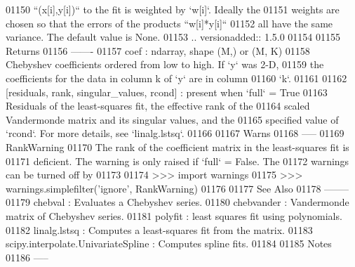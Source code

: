 \begin{DoxyCode}
01150 \textcolor{stringliteral}{        ``(x[i],y[i])`` to the fit is weighted by `w[i]`. Ideally the}
01151 \textcolor{stringliteral}{        weights are chosen so that the errors of the products ``w[i]*y[i]``}
01152 \textcolor{stringliteral}{        all have the same variance.  The default value is None.}
01153 \textcolor{stringliteral}{        .. versionadded:: 1.5.0}
01154 \textcolor{stringliteral}{}
01155 \textcolor{stringliteral}{    Returns}
01156 \textcolor{stringliteral}{    -------}
01157 \textcolor{stringliteral}{    coef : ndarray, shape (M,) or (M, K)}
01158 \textcolor{stringliteral}{        Chebyshev coefficients ordered from low to high. If `y` was 2-D,}
01159 \textcolor{stringliteral}{        the coefficients for the data in column k  of `y` are in column}
01160 \textcolor{stringliteral}{        `k`.}
01161 \textcolor{stringliteral}{}
01162 \textcolor{stringliteral}{    [residuals, rank, singular\_values, rcond] : present when `full` = True}
01163 \textcolor{stringliteral}{        Residuals of the least-squares fit, the effective rank of the}
01164 \textcolor{stringliteral}{        scaled Vandermonde matrix and its singular values, and the}
01165 \textcolor{stringliteral}{        specified value of `rcond`. For more details, see `linalg.lstsq`.}
01166 \textcolor{stringliteral}{}
01167 \textcolor{stringliteral}{    Warns}
01168 \textcolor{stringliteral}{    -----}
01169 \textcolor{stringliteral}{    RankWarning}
01170 \textcolor{stringliteral}{        The rank of the coefficient matrix in the least-squares fit is}
01171 \textcolor{stringliteral}{        deficient. The warning is only raised if `full` = False.  The}
01172 \textcolor{stringliteral}{        warnings can be turned off by}
01173 \textcolor{stringliteral}{}
01174 \textcolor{stringliteral}{        >>> import warnings}
01175 \textcolor{stringliteral}{        >>> warnings.simplefilter('ignore', RankWarning)}
01176 \textcolor{stringliteral}{}
01177 \textcolor{stringliteral}{    See Also}
01178 \textcolor{stringliteral}{    --------}
01179 \textcolor{stringliteral}{    chebval : Evaluates a Chebyshev series.}
01180 \textcolor{stringliteral}{    chebvander : Vandermonde matrix of Chebyshev series.}
01181 \textcolor{stringliteral}{    polyfit : least squares fit using polynomials.}
01182 \textcolor{stringliteral}{    linalg.lstsq : Computes a least-squares fit from the matrix.}
01183 \textcolor{stringliteral}{    scipy.interpolate.UnivariateSpline : Computes spline fits.}
01184 \textcolor{stringliteral}{}
01185 \textcolor{stringliteral}{    Notes}
01186 \textcolor{stringliteral}{    -----}

\end{DoxyCode}

